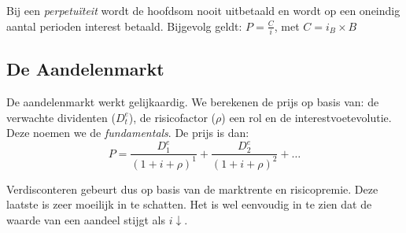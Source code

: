Bij een \textit{perpetu\"iteit} wordt de hoofdsom nooit uitbetaald en wordt op een oneindig aantal perioden interest betaald. Bijgevolg geldt: $P = \frac{C}{i}$, met $C = i_B \times B$


\subsection{De Aandelenmarkt}
\label{sub:De Aandelenmarkt}
De aandelenmarkt werkt gelijkaardig. We berekenen de prijs op basis van: de verwachte dividenten ($D_t^e$), de risicofactor ($\rho$) een rol en de interestvoetevolutie. Deze noemen we de \textit{fundamentals}. De prijs is dan:
\begin{equation}
  P = \frac{D_1^e}{(1 + i + \rho)^1} +  \frac{D_2^e}{(1 + i + \rho)^2} + \dots
\end{equation}

Verdisconteren gebeurt dus op basis van de marktrente en risicopremie. Deze laatste is zeer moeilijk in te schatten. Het is wel eenvoudig in te zien dat de waarde van een aandeel stijgt als $i\downarrow$.
